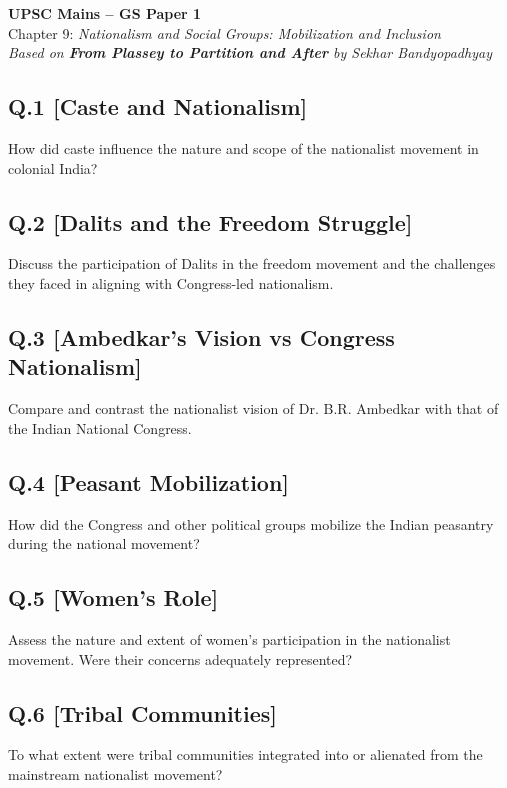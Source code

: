 \begin{center}
    \Large\textbf{UPSC Mains – GS Paper 1}\\
    \normalsize Chapter 9: \textit{Nationalism and Social Groups: Mobilization and Inclusion}\\
    \vspace{0.5em}
    \textit{Based on \textbf{From Plassey to Partition and After} by Sekhar Bandyopadhyay}
\end{center}

\vspace{1em}

\subsection*{Q.1 [Caste and Nationalism]}
How did caste influence the nature and scope of the nationalist movement in colonial India?

\subsection*{Q.2 [Dalits and the Freedom Struggle]}
Discuss the participation of Dalits in the freedom movement and the challenges they faced in aligning with Congress-led nationalism.

\subsection*{Q.3 [Ambedkar’s Vision vs Congress Nationalism]}
Compare and contrast the nationalist vision of Dr. B.R. Ambedkar with that of the Indian National Congress.

\subsection*{Q.4 [Peasant Mobilization]}
How did the Congress and other political groups mobilize the Indian peasantry during the national movement?

\subsection*{Q.5 [Women’s Role]}
Assess the nature and extent of women’s participation in the nationalist movement. Were their concerns adequately represented?

\subsection*{Q.6 [Tribal Communities]}
To what extent were tribal communities integrated into or alienated from the mainstream nationalist movement?


